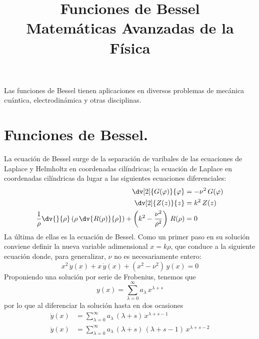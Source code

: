 
\title{Funciones de Bessel \\ {\large Matemáticas Avanzadas de la Física}}
\date{ }

\renewcommand\labelenumii{\theenumi.{\arabic{enumii}}}
\maketitle
\fontsize{14}{14}\selectfont
Las funciones de Bessel tienen aplicaciones en diversos problemas de mecánica cuántica, electrodinámica y otras disciplinas.
\section{Funciones de Bessel.}
La ecuación de Bessel surge de la separación de varibales de las ecuaciones de Laplace y Helmholtz en coordenadas cilíndricas; la ecuación de Laplace en coordenadas cilíndricas da lugar a las siguientes ecuaciones diferenciales:
\begin{align}
\begin{aligned}
\dv[2]{G(\varphi)}{\varphi} &= - \nu^{2} \, G(\varphi) \\
\dv[2]{Z(z)}{z} &= k^{2} \, Z(z) \\
\dfrac{1}{\rho} \dv{}{\rho} \left( \rho \, \dv{R(\rho)}{\rho} \right) + \left( k^{2} - \dfrac{\nu^{2}}{\rho^{2}} \right) \, R(\rho) &= 0
\end{aligned}
\label{eq:ecuacion_08_02} 
\end{align}
La última de ellas es la ecuación de Bessel. Como un primer paso en su solución conviene definir la nueva variable adimensional $ x = k \rho$, que conduce a la siguiente ecuación donde, para generalizar, $\nu$ no es necesariamente entero:
\begin{equation}
x^{2} \, \ddot{y} (x) +  x \, \dot{y} (x) +  (x^{2} - \nu^{2}) \, y(x) = 0
\label{eq:ecuacion_08_03}
\end{equation}
Proponiendo una solución por serie de Frobenius, tenemos que
\[ y(x) = \sum_{\lambda=0}^{\infty} a_{\lambda} \, x^{\lambda + s} \]
por lo que al diferenciar la solución hasta en dos ocasiones
\begin{align*}
\dot{y}(x) &= \sum_{\lambda=0}^{\infty} a_{\lambda} \, (\lambda + s) \, x^{\lambda + s - 1} \\
\ddot{y}(x) &= \sum_{\lambda=0}^{\infty} a_{\lambda} \, (\lambda + s) \, (\lambda + s - 1) \, x^{\lambda + s - 2}
\end{align*}
